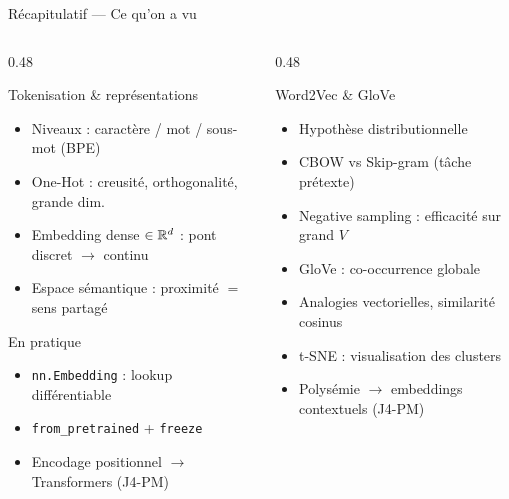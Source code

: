 \documentclass[aspectratio=169, 10pt]{beamer}
\begin{document}
\begin{frame}{Récapitulatif --- Ce qu'on a vu}
  \begin{columns}[T]
    \begin{column}{0.48\textwidth}
      \begin{block}{Tokenisation \& représentations}
        \begin{itemize}\small
          \item Niveaux : caractère / mot / sous-mot (BPE)
          \item One-Hot : creusité, orthogonalité, grande dim.
          \item Embedding dense $\in \mathbb{R}^d$ : pont discret $\to$ continu
          \item Espace sémantique : proximité $=$ sens partagé
        \end{itemize}
      \end{block}
      \vspace{4pt}
      \begin{block}{En pratique}
        \begin{itemize}\small
          \item \texttt{nn.Embedding} : lookup différentiable
          \item \texttt{from\_pretrained} + \texttt{freeze}
          \item Encodage positionnel $\to$ Transformers (J4-PM)
        \end{itemize}
      \end{block}
    \end{column}
    \begin{column}{0.48\textwidth}
      \begin{block}{Word2Vec \& GloVe}
        \begin{itemize}\small
          \item Hypothèse distributionnelle
          \item CBOW vs Skip-gram (tâche prétexte)
          \item Negative sampling : efficacité sur grand $V$
          \item GloVe : co-occurrence globale
          \item Analogies vectorielles, similarité cosinus
          \item t-SNE : visualisation des clusters
          \item Polysémie $\to$ embeddings contextuels (J4-PM)
        \end{itemize}
      \end{block}
    \end{column}
  \end{columns}
\end{frame}
\end{document}
